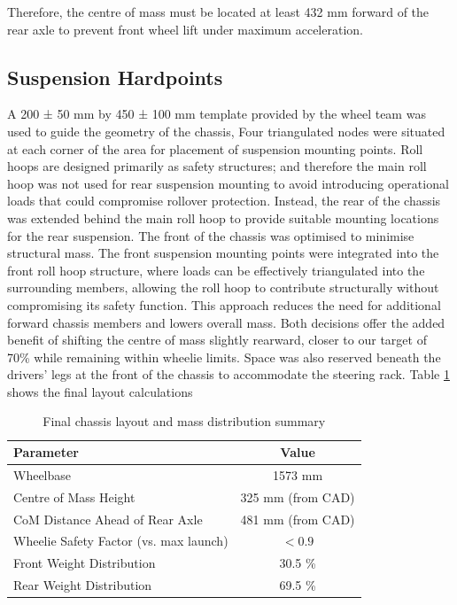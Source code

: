 \documentclass[11pt, a4paper]{report}
\numberwithin{equation}{section}
\begin{document}
\begin{refsection}
Therefore, the centre of mass must be located at least 432 mm forward of the rear axle to prevent front wheel lift under maximum acceleration.

\subsection{Suspension Hardpoints}

A 200 ± 50 mm by 450 ± 100 mm template provided by the wheel team was used to guide the geometry of the chassis, Four triangulated nodes were situated at each corner of the area for placement of suspension mounting points. Roll hoops are designed primarily as safety structures; and therefore the main roll hoop was not used for rear suspension mounting to avoid introducing operational loads that could compromise rollover protection. Instead, the rear of the chassis was extended behind the main roll hoop to provide suitable mounting locations for the rear suspension. The front of the chassis was optimised to minimise structural mass. The front suspension mounting points were integrated into the front roll hoop structure, where loads can be effectively triangulated into the surrounding members, allowing the roll hoop to contribute structurally without compromising its safety function. This approach reduces the need for additional forward chassis members and lowers overall mass. Both decisions offer the added benefit of shifting the centre of mass slightly rearward, closer to our target of 70\% while remaining within wheelie limits. Space was also reserved beneath the drivers' legs at the front of the chassis to accommodate the steering rack. Table \ref{tab:layout_summary} shows the final layout calculations

\begin{table}[h]
    \centering
    \caption{Final chassis layout and mass distribution summary}
    \label{tab:layout_summary}
    \begin{tabular}{|l|c|}
        \hline
        \textbf{Parameter} & \textbf{Value} \\
        \hline
        Wheelbase & 1573 mm \\
        Centre of Mass Height & 325 mm (from CAD) \\
        CoM Distance Ahead of Rear Axle & 481 mm (from CAD) \\
        Wheelie Safety Factor (vs. max launch) & $< 0.9$ \\
        Front Weight Distribution & 30.5 \% \\
        Rear Weight Distribution & 69.5 \% \\
        \hline
    \end{tabular}
\end{table}
\vspace{-16pt}

\end{refsection}
\end{document}
